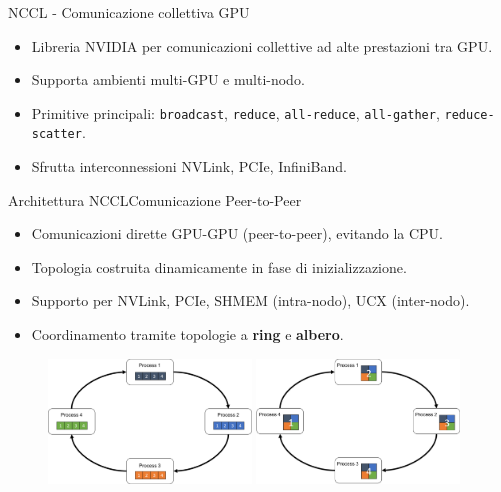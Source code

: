 \documentclass{beamer}
\begin{document}


\begin{frame}{NCCL - Comunicazione collettiva GPU}
    \begin{itemize}
        \item Libreria NVIDIA per comunicazioni collettive ad alte prestazioni tra GPU.
        \item Supporta ambienti multi-GPU e multi-nodo.
        \item Primitive principali: \texttt{broadcast}, \texttt{reduce}, \texttt{all-reduce}, \texttt{all-gather}, \texttt{reduce-scatter}.
        \item Sfrutta interconnessioni NVLink, PCIe, InfiniBand.
    \end{itemize}
\end{frame}

\begin{frame}{Architettura NCCL}{Comunicazione Peer-to-Peer}
    \begin{itemize}
        \item Comunicazioni dirette GPU-GPU (peer-to-peer), evitando la CPU.
        \item Topologia costruita dinamicamente in fase di inizializzazione.
        \item Supporto per NVLink, PCIe, SHMEM (intra-nodo), UCX (inter-nodo).
        \item Coordinamento tramite topologie a \textbf{ring} e \textbf{albero}.
    \end{itemize}

    \begin{figure}
        \centering
        \includegraphics[width=0.48\textwidth]{imgs/nccl_topology_ring_tree.png}%
        \hfill
        \includegraphics[width=0.48\textwidth]{imgs/nccl_topology_ring_tree_2.png}
        \label{fig:ring-tree}
    \end{figure}
\end{frame}
\end{document}
